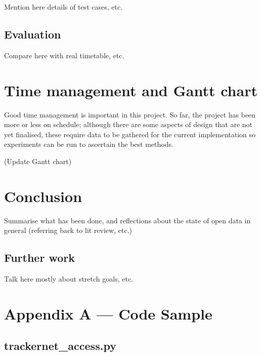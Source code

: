 \documentclass[a4paper,12pt]{article}
\begin{document}
Mention here details of test cases, etc.

\subsection{Evaluation}

Compare here with real timetable, etc.

\section{Time management and Gantt chart}

Good time management is important in this project. So far, the project has been
more or less on schedule; although there are some aspects of design that are
not yet finalised, these require data to be gathered for the current
implementation so experiments can be run to ascertain the best methods.



(Update Gantt chart)

\section{Conclusion}

Summarise what has been done, and reflections about the state of open data in
general (referring back to lit review, etc.)

\subsection{Further work}

Talk here mostly about stretch goals, etc.

\pagebreak





\section*{Appendix A --- Code Sample}

\subsection*{trackernet\_access.py}


\end{document}
